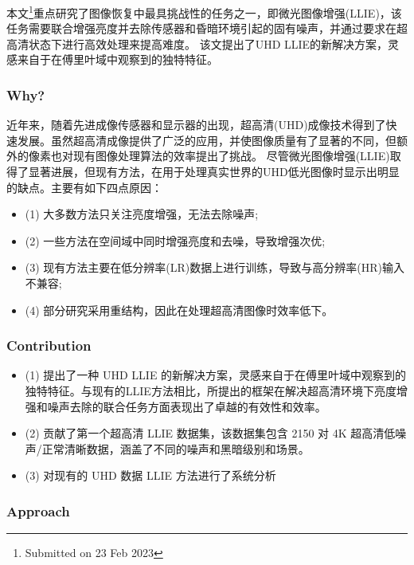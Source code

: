 \documentclass[letterpaper,10pt]{article}
\begin{document}
	本文\footnote{Submitted on 23 Feb 2023}重点研究了图像恢复中最具挑战性的任务之一，即微光图像增强(LLIE)，该任务需要联合增强亮度并去除传感器和昏暗环境引起的固有噪声，并通过要求在超高清状态下进行高效处理来提高难度。
	该文提出了UHD LLIE的新解决方案，灵感来自于在傅里叶域中观察到的独特特征。
	
	\subsubsection{Why?}
	
	近年来，随着先进成像传感器和显示器的出现，超高清(UHD)成像技术得到了快速发展。虽然超高清成像提供了广泛的应用，并使图像质量有了显著的不同，但额外的像素也对现有图像处理算法的效率提出了挑战。
	尽管微光图像增强(LLIE)取得了显著进展，但现有方法，在用于处理真实世界的UHD低光图像时显示出明显的缺点。主要有如下四点原因：
	
	\begin{itemize}
		\item {}
			(1) 大多数方法只关注亮度增强，无法去除噪声;
		\item {}
			(2) 一些方法在空间域中同时增强亮度和去噪，导致增强次优;
		\item {}
			(3) 现有方法主要在低分辨率(LR)数据上进行训练，导致与高分辨率(HR)输入不兼容;
		\item {}
			(4) 部分研究采用重结构，因此在处理超高清图像时效率低下。
	\end{itemize}
		
	\subsubsection{Contribution}

	\begin{itemize}
		\item {}
			(1) 提出了一种 UHD LLIE 的新解决方案，灵感来自于在傅里叶域中观察到的独特特征。与现有的LLIE方法相比，所提出的框架在解决超高清环境下亮度增强和噪声去除的联合任务方面表现出了卓越的有效性和效率。
		\item {}
			(2) 贡献了第一个超高清 LLIE 数据集，该数据集包含 2150 对 4K 超高清低噪声/正常清晰数据，涵盖了不同的噪声和黑暗级别和场景。
		\item {}
			(3) 对现有的 UHD 数据 LLIE 方法进行了系统分析
	\end{itemize}
	
	\subsubsection{Approach}
	
\end{document}
